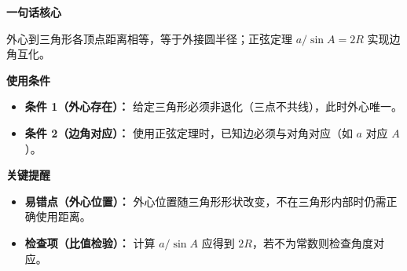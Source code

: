 \begin{summarybox}
	\textbf{\textcolor{CSummary}{一句话核心}}

	外心到三角形各顶点距离相等，等于外接圆半径；正弦定理 $a/\sin A = 2R$ 实现边角互化。

	\medskip
	\textbf{\textcolor{CSummary}{使用条件}}
	\begin{itemize}[leftmargin=*, itemsep=0.5em, topsep=0.4em]
		\item \textbf{条件 1（外心存在）：} 给定三角形必须非退化（三点不共线），此时外心唯一。
		\item \textbf{条件 2（边角对应）：} 使用正弦定理时，已知边必须与对角对应（如 $a$ 对应 $A$）。
	\end{itemize}

	\medskip
	\textbf{\textcolor{CSummary}{关键提醒}}
	\begin{itemize}[leftmargin=*, itemsep=0.5em, topsep=0.4em]
		\item \textbf{易错点（外心位置）：} 外心位置随三角形形状改变，不在三角形内部时仍需正确使用距离。
		\item \textbf{检查项（比值检验）：} 计算 $a/\sin A$ 应得到 $2R$，若不为常数则检查角度对应。
	\end{itemize}
\end{summarybox}
